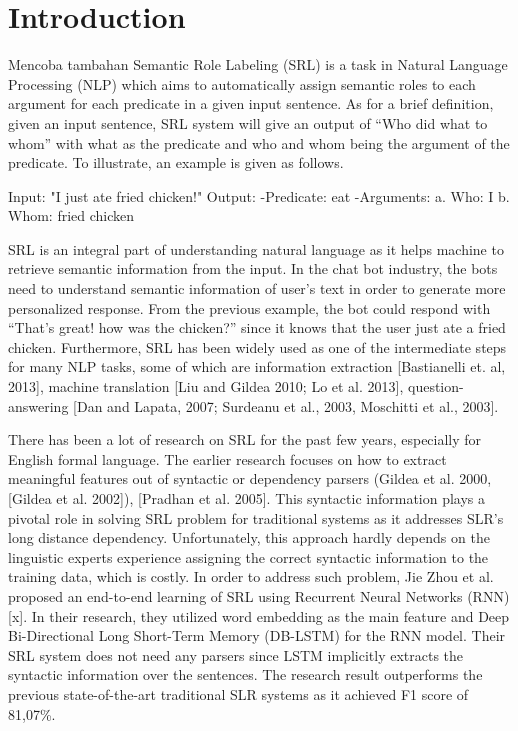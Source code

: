 \section{Introduction}
Mencoba tambahan
Semantic Role Labeling (SRL) is a task in Natural Language Processing (NLP) which aims to automatically assign semantic roles to each argument for each predicate in a given input sentence. As for a brief definition, given an input sentence, SRL system will give an output of “Who did what to whom” with what as the predicate and who and whom being the argument of the predicate. To illustrate, an example is given as follows.

Input: "I just ate fried chicken!"
Output:
-Predicate: eat
-Arguments:
a. Who: I
b. Whom: fried chicken

SRL is an integral part of understanding natural language as it helps machine to retrieve semantic information from the input. In the chat bot industry, the bots need to understand semantic information of user’s text in order to generate more personalized response. From the previous example, the bot could respond with “That’s great! how was the chicken?” since it knows that the user just ate a fried chicken. Furthermore, SRL has been widely used as one of the intermediate steps for many NLP tasks, some of which are information extraction [Bastianelli et. al, 2013], machine translation [Liu and Gildea 2010; Lo et al. 2013], question-answering [Dan and Lapata, 2007; Surdeanu et al., 2003, Moschitti et al., 2003].

There has been a lot of research on SRL for the past few years, especially for English formal language. The earlier research focuses on how to extract meaningful features out of syntactic or dependency parsers (Gildea et al. 2000, [Gildea et al. 2002]), [Pradhan et al. 2005].  This syntactic information plays a pivotal role in solving SRL problem for traditional systems as it addresses SLR’s long distance dependency. Unfortunately, this approach hardly depends on the linguistic experts experience assigning the correct syntactic information to the training data, which is costly. In order to address such problem, Jie Zhou et al. proposed an end-to-end learning of SRL using Recurrent Neural Networks (RNN) [x]. In their research, they utilized word embedding as the main feature and Deep Bi-Directional Long Short-Term Memory (DB-LSTM) for the RNN model. Their SRL system does not need any parsers since LSTM implicitly extracts the syntactic information over the sentences. The research result outperforms the previous state-of-the-art traditional SLR systems as it achieved F1 score of 81,07\%.

